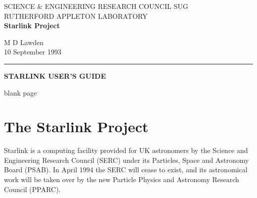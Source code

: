 \pagestyle{myheadings}
\renewcommand{\_}{{\tt\char'137}}     %
\setlength{\textwidth}{100mm}
\setlength{\textheight}{154mm}
\setlength{\topmargin}{-0mm}
\setlength{\oddsidemargin}{0mm}
\setlength{\evensidemargin}{0mm}
\setlength{\parindent}{0mm}
\setlength{\parskip}{\medskipamount}
\setlength{\unitlength}{1mm}


\thispagestyle{empty}
SCIENCE \& ENGINEERING RESEARCH COUNCIL \hfill SUG \\
RUTHERFORD APPLETON LABORATORY\\
{\Large\bf Starlink Project\\}
\begin{flushright}
M D Lawden\\
10 September 1993
\end{flushright}
\vspace{-8mm}
\rule{\textwidth}{0.5mm}
\vspace{5mm}
\begin{center}
{\LARGE\bf STARLINK USER'S GUIDE}
\end{center}
\vspace{5mm}

\setlength{\parskip}{0mm}
\tableofcontents
\setlength{\parskip}{\medskipamount}

\newpage

blank page

\newpage
\setcounter{page}{1}

\section{The Starlink Project}

Starlink is a computing facility provided for UK astronomers by the Science and
Engineering Research Council (SERC) under its Particles, Space and Astronomy
Board (PSAB).
In April 1994 the SERC will cease to exist, and its astronomical work will be
taken over by the new Particle Physics and Astronomy Research Council (PPARC).

